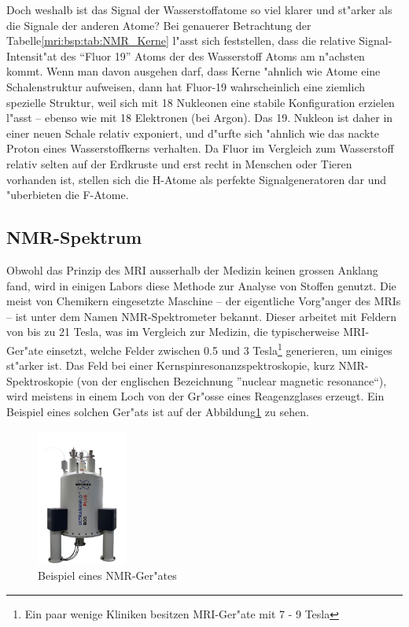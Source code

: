 Doch weshalb ist das Signal der Wasserstoffatome so viel klarer und st"arker als die Signale der anderen Atome? Bei genauerer Betrachtung der Tabelle\;\ref{mri:bsp:tab:NMR_Kerne} l"asst sich feststellen, dass die relative Signal-Intensit"at des "`Fluor 19"' Atoms der des Wasserstoff Atoms am n"achsten kommt. Wenn man davon ausgehen darf, dass Kerne "ahnlich wie Atome eine Schalenstruktur aufweisen, dann hat Fluor-19 wahrscheinlich eine ziemlich spezielle Struktur, weil sich mit 18 Nukleonen eine stabile Konfiguration erzielen l"asst -- ebenso wie mit 18 Elektronen (bei Argon). Das 19. Nukleon ist daher in einer neuen Schale relativ exponiert, und d"urfte sich "ahnlich wie das nackte Proton eines Wasserstoffkerns verhalten. Da Fluor im Vergleich zum Wasserstoff relativ selten auf der Erdkruste und erst recht in Menschen oder Tieren vorhanden ist, stellen sich die H-Atome als perfekte Signalgeneratoren dar und "uberbieten die F-Atome. 

\subsection{NMR-Spektrum}
Obwohl das Prinzip des MRI ausserhalb der Medizin keinen grossen Anklang fand, wird in einigen Labors diese Methode zur Analyse von Stoffen genutzt. Die meist von Chemikern eingesetzte Maschine -- der eigentliche Vorg"anger des MRIs -- ist unter dem Namen NMR-Spektrometer bekannt. Dieser arbeitet mit Feldern von bis zu 21 Tesla, was im Vergleich zur Medizin, die typischerweise MRI-Ger"ate einsetzt, welche Felder zwischen 0.5 und 3 Tesla\footnote{Ein paar wenige Kliniken besitzen MRI-Ger"ate mit 7 - 9 Tesla} generieren, um einiges st"arker ist. Das Feld bei einer Kernspinresonanzspektroskopie, kurz NMR-Spektroskopie (von der englischen Bezeichnung ”nuclear magnetic resonance“), wird meistens in einem Loch von der Gr"osse eines Reagenzglases erzeugt. Ein Beispiel eines solchen Ger"ats ist auf der Abbildung\;\ref{mri:bsp:abb:nmr_Beispiel} zu sehen. 
\begin{figure}[h]
	\centering
	\includegraphics[width = 3cm]{./mri/pic/NMR.png}
	\caption{Beispiel eines NMR-Ger"ates \cite{skript:mri:MaxPlanckCampus}}
	\label{mri:bsp:abb:nmr_Beispiel}
\end{figure}

